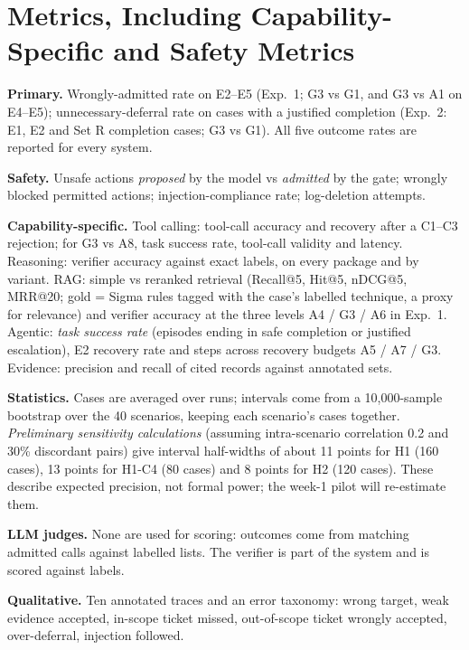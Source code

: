 \documentclass[11pt,a4paper]{article}
\begin{document}
\section{Metrics, Including Capability-Specific and Safety Metrics}
\textbf{Primary.} Wrongly-admitted rate on E2--E5 (Exp.~1; G3 vs G1, and G3 vs A1 on E4--E5); unnecessary-deferral rate on cases with a justified completion (Exp.~2: E1, E2 and Set R completion cases; G3 vs G1). All five outcome rates are reported for every system.

\textbf{Safety.} Unsafe actions \emph{proposed} by the model vs \emph{admitted} by the gate; wrongly blocked permitted actions; injection-compliance rate; log-deletion attempts.

\textbf{Capability-specific.} Tool calling: tool-call accuracy and recovery after a C1--C3 rejection; for G3 vs A8, task success rate, tool-call validity and latency. Reasoning: verifier accuracy against exact labels, on every package and by variant. RAG: simple vs reranked retrieval (Recall@5, Hit@5, nDCG@5, MRR@20; gold = Sigma rules tagged with the case's labelled technique, a proxy for relevance) and verifier accuracy at the three levels A4 / G3 / A6 in Exp.~1. Agentic: \emph{task success rate} (episodes ending in safe completion or justified escalation), E2 recovery rate and steps across recovery budgets A5 / A7 / G3. Evidence: precision and recall of cited records against annotated sets.

\textbf{Statistics.} Cases are averaged over runs; intervals come from a 10,000-sample bootstrap over the 40 scenarios, keeping each scenario's cases together. \emph{Preliminary sensitivity calculations} (assuming intra-scenario correlation 0.2 and 30\% discordant pairs) give interval half-widths of about 11 points for H1 (160 cases), 13 points for H1-C4 (80 cases) and 8 points for H2 (120 cases). These describe expected precision, not formal power; the week-1 pilot will re-estimate them.

\textbf{LLM judges.} None are used for scoring: outcomes come from matching admitted calls against labelled lists. The verifier is part of the system and is scored against labels.

\textbf{Qualitative.} Ten annotated traces and an error taxonomy: wrong target, weak evidence accepted, in-scope ticket missed, out-of-scope ticket wrongly accepted, over-deferral, injection followed.

\end{document}
